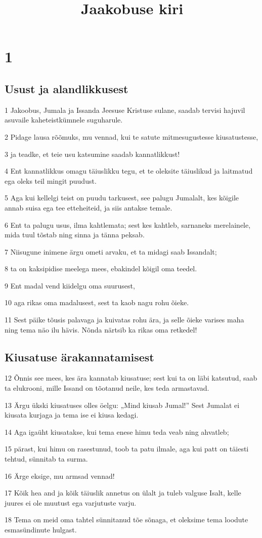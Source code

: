 

\title{Jaakobuse kiri}

\chapter{1}

\section*{Usust ja alandlikkusest}

\par 1 Jakoobus, Jumala ja Issanda Jeesuse Kristuse sulane, saadab tervisi hajuvil asuvaile kaheteistkümnele suguharule.
\par 2 Pidage lausa rõõmuks, mu vennad, kui te satute mitmesugustesse kiusatustesse,
\par 3 ja teadke, et teie usu katsumine saadab kannatlikkust!
\par 4 Ent kannatlikkus omagu täiuslikku tegu, et te oleksite täiuslikud ja laitmatud ega oleks teil mingit puudust.
\par 5 Aga kui kellelgi teist on puudu tarkusest, see palugu Jumalalt, kes kõigile annab suisa ega tee etteheiteid, ja siis antakse temale.
\par 6 Ent ta palugu usus, ilma kahtlemata; sest kes kahtleb, sarnaneks merelainele, mida tuul tõstab ning sinna ja tänna peksab.
\par 7 Niisugune inimene ärgu ometi arvaku, et ta midagi saab Issandalt;
\par 8 ta on kaksipidise meelega mees, ebakindel kõigil oma teedel.
\par 9 Ent madal vend kiidelgu oma suurusest,
\par 10 aga rikas oma madalusest, sest ta kaob nagu rohu õieke.
\par 11 Sest päike tõusis palavaga ja kuivatas rohu ära, ja selle õieke varises maha ning tema näo ilu hävis. Nõnda närtsib ka rikas oma retkedel!

\section*{Kiusatuse ärakannatamisest}

\par 12 Õnnis see mees, kes ära kannatab kiusatuse; sest kui ta on läbi katsutud, saab ta elukrooni, mille Issand on tõotanud neile, kes teda armastavad.
\par 13 Ärgu ükski kiusatuses olles öelgu: „Mind kiusab Jumal!” Sest Jumalat ei kiusata kurjaga ja tema ise ei kiusa kedagi.
\par 14 Aga igaüht kiusatakse, kui tema enese himu teda veab ning ahvatleb;
\par 15 pärast, kui himu on rasestunud, toob ta patu ilmale, aga kui patt on täiesti tehtud, sünnitab ta surma.
\par 16 Ärge eksige, mu armsad vennad!
\par 17 Kõik hea and ja kõik täiuslik annetus on ülalt ja tuleb valguse Isalt, kelle juures ei ole muutust ega varjutuste varju.
\par 18 Tema on meid oma tahtel sünnitanud tõe sõnaga, et oleksime tema loodute esmasündinute hulgast.

